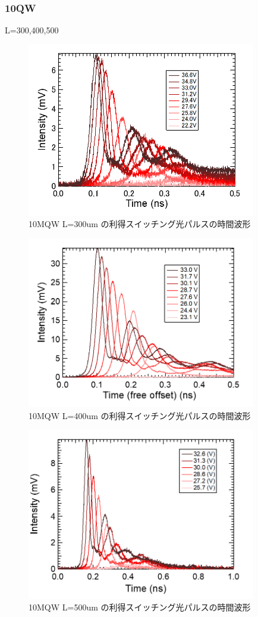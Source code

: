 \subsubsection{10QW}%
L=300,400,500
\begin{figure}[h]
	\centering
	\includegraphics[width=10cm]{figure/fig_3_2_10QW_ridge_L300_GS.png}
		\caption{10MQW L=300um の利得スイッチング光パルスの時間波形}
		\label{fig:fig_3_2_10QW_ridge_L400_GS}
\end{figure}

\begin{figure}[h]
	\centering
	\includegraphics[width=10cm]{figure/fig_3_2_10QW_ridge_L400_GS.png}
		\caption{10MQW L=400um の利得スイッチング光パルスの時間波形}
		\label{fig:fig_3_2_10QW_ridge_L400_GS}
\end{figure}
\begin{figure}[h]
	\centering
	\includegraphics[width=10cm]{figure/fig_3_2_10QW_ridge_L500_GS.png}
		\caption{10MQW L=500um の利得スイッチング光パルスの時間波形}
		\label{fig:fig_3_2_10QW_ridge_L500_GS}
\end{figure}
\newpage 
　　　
